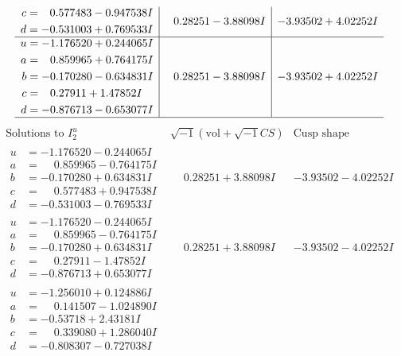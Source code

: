 \documentclass[1p]{elsarticle_modified}
\theoremstyle{definition}
\newcommand{\I}{\sqrt{-1}}
\begin{document}
$$\begin{array}{c|c|c}
\begin{aligned}
c &= \phantom{-}0.577483 - 0.947538 I \\
d &= -0.531003 + 0.769533 I\end{aligned}
 & \phantom{-}0.28251 - 3.88098 I & -3.93502 + 4.02252 I \\ \hline\begin{aligned}
u &= -1.176520 + 0.244065 I \\
a &= \phantom{-}0.859965 + 0.764175 I \\
b &= -0.170280 - 0.634831 I \\
c &= \phantom{-}0.27911 + 1.47852 I \\
d &= -0.876713 - 0.653077 I\end{aligned}
 & \phantom{-}0.28251 - 3.88098 I & -3.93502 + 4.02252 I\\
 \hline 
 \end{array}$$\newpage$$\begin{array}{c|c|c}  
\text{Solutions to }I^u_{2}& \I (\text{vol} + \sqrt{-1}CS) & \text{Cusp shape}\\
 \hline 
\begin{aligned}
u &= -1.176520 - 0.244065 I \\
a &= \phantom{-}0.859965 - 0.764175 I \\
b &= -0.170280 + 0.634831 I \\
c &= \phantom{-}0.577483 + 0.947538 I \\
d &= -0.531003 - 0.769533 I\end{aligned}
 & \phantom{-}0.28251 + 3.88098 I & -3.93502 - 4.02252 I \\ \hline\begin{aligned}
u &= -1.176520 - 0.244065 I \\
a &= \phantom{-}0.859965 - 0.764175 I \\
b &= -0.170280 + 0.634831 I \\
c &= \phantom{-}0.27911 - 1.47852 I \\
d &= -0.876713 + 0.653077 I\end{aligned}
 & \phantom{-}0.28251 + 3.88098 I & -3.93502 - 4.02252 I \\ \hline\begin{aligned}
u &= -1.256010 + 0.124886 I \\
a &= \phantom{-}0.141507 - 1.024890 I \\
b &= -0.53718 + 2.43181 I \\
c &= \phantom{-}0.339080 + 1.286040 I \\
d &= -0.808307 - 0.727038 I\end{aligned}

\end{array}$$
\end{document}
